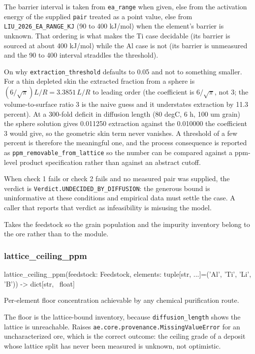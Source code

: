 \documentclass[10pt,a4paper,twoside]{report}
\begin{document}
The barrier interval is taken from \texttt{ea\_range} when given, else from the activation energy of the supplied \texttt{pair} treated as a point value, else from \texttt{LIU\_2026\_EA\_RANGE\_KJ} (90 to 400 kJ/mol) when the element's barrier is unknown. That ordering is what makes the Ti case decidable (its barrier is sourced at about 400 kJ/mol) while the Al case is not (its barrier is unmeasured and the 90 to 400 interval straddles the threshold).

On why \texttt{extraction\_threshold} defaults to 0.05 and not to something smaller. For a thin depleted skin the extracted fraction from a sphere is $(6/\sqrt{\pi})L/R = 3.3851\,L/R$ to leading order (the coefficient is $6/\sqrt{\pi}$, not 3; the volume-to-surface ratio 3 is the naive guess and it understates extraction by 11.3 percent). At a 300-fold deficit in diffusion length (80 degC, 6 h, 100 um grain) the sphere solution gives 0.011250 extraction against the 0.010000 the coefficient 3 would give, so the geometric skin term never vanishes. A threshold of a few percent is therefore the meaningful one, and the process consequence is reported as \texttt{ppm\_removable\_from\_lattice} so the number can be compared against a ppm-level product specification rather than against an abstract cutoff.

When check 1 fails or check 2 fails and no measured pair was supplied, the verdict is \texttt{Verdict.UNDECIDED\_BY\_DIFFUSION}: the generous bound is uninformative at these conditions and empirical data must settle the case. A caller that reports that verdict as infeasibility is misusing the model.

Takes the feedstock so the grain population and the impurity inventory belong to the ore rather than to the module.

\subsubsection*{lattice\_ceiling\_ppm}

\begin{verbatimsmall}
lattice_ceiling_ppm(feedstock: Feedstock, elements: tuple[str, ...]=('Al', 'Ti', 'Li', 'B')) -> dict[str, 
    \ float]
\end{verbatimsmall}

Per-element floor concentration achievable by any chemical purification route.

The floor is the lattice-bound inventory, because \texttt{diffusion\_length} shows the lattice is unreachable. Raises \texttt{ae.core.provenance.MissingValueError} for an uncharacterized ore, which is the correct outcome: the ceiling grade of a deposit whose lattice split has never been measured is unknown, not optimistic.
\end{document}

